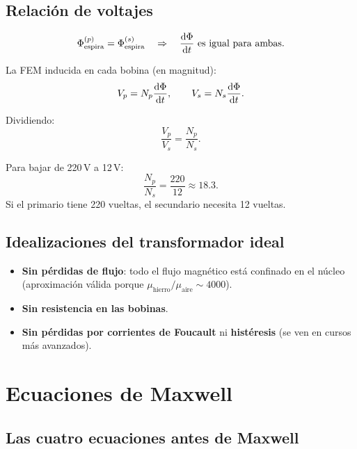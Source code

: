 \documentclass[12pt,a4paper]{article}
\begin{document}
\subsection{Relación de voltajes}

\[
\Phi_{\text{espira}}^{(p)} = \Phi_{\text{espira}}^{(s)}
\quad\Rightarrow\quad
\dv{\Phi}{t}\ \text{es igual para ambas}.
\]

La FEM inducida en cada bobina (en magnitud):
\[
V_p = N_p \dv{\Phi}{t},\qquad
V_s = N_s \dv{\Phi}{t}.
\]

Dividiendo:
\[
\boxed{\frac{V_p}{V_s} = \frac{N_p}{N_s}}.
\]

\begin{notebox}[Ejemplo]
  Para bajar de 220\,V a 12\,V:
  \[
  \frac{N_p}{N_s} = \frac{220}{12} \approx 18.3.
  \]
  Si el primario tiene 220 vueltas, el secundario necesita 12
  vueltas.
\end{notebox}

\subsection{Idealizaciones del transformador ideal}

\begin{itemize}
  \item \textbf{Sin pérdidas de flujo}: todo el flujo magnético está
        confinado en el núcleo (aproximación válida porque
        \(\mu_{\text{hierro}} / \mu_{\text{aire}} \sim 4000\)).
  \item \textbf{Sin resistencia en las bobinas}.
  \item \textbf{Sin pérdidas por corrientes de Foucault} ni
        \textbf{histéresis} (se ven en cursos más avanzados).
\end{itemize}

\section{Ecuaciones de Maxwell}

\subsection{Las cuatro ecuaciones antes de Maxwell}
\end{document}

